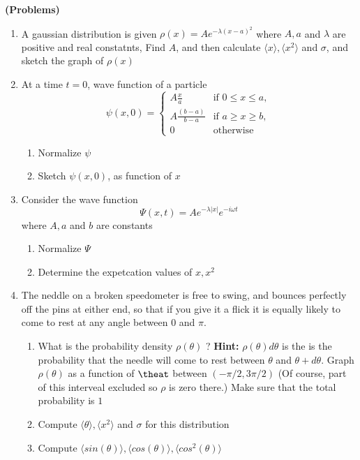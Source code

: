 \documentclass{article}[12pt, a4paper]
\begin{document}
\centering \textbf{(Problems)}
\begin{enumerate}
\item A gaussian distribution is given $\rho(x) = A e^{-\lambda (x - a)^2}$ where $A, a$ and $\lambda$ are positive and real constatnts, Find $A$, and then calculate $\langle x \rangle, \langle x^2 \rangle $ and $\sigma$, and sketch the graph of $\rho (x)$

\item At a time $t = 0$, wave function of a particle
$$
\psi (x, 0) =
\begin{cases}
	A \frac{x}{a} & \text{if } 0 \le x \le a, \\
	A \frac{(b - a)}{b - a} & \text{if } a \ge x \ge b, \\
	0 & \text{otherwise}

\end{cases}$$
\begin{enumerate}
	\item Normalize $\psi$
	\item Sketch $\psi(x, 0)$, as function of $x$
\end{enumerate}

\item Consider the wave function $$\Psi(x,t) = Ae^{-\lambda |x|}e^{-i\omega t}$$
where $A, a$ and $b$ are constants
\begin{enumerate}
	\item Normalize $\Psi$
	\item Determine the expetcation values of $x, x^2$
\end{enumerate}

\item The neddle on a broken speedometer is free to swing, and bounces perfectly off the pins at
either end, so that if you give it a flick it is equally likely to come to rest at any angle between $0$ and $\pi$.
\begin{enumerate}
	\item What is the probability density $\rho(\theta)$ ? \textbf{Hint:} $\rho(\theta)d\theta$ is the
	is the probability that the needle will come to rest between $\theta$ and $\theta+d\theta$.
	Graph $\rho(\theta)$ as a function of $\theat$ between $(-\pi/2, 3\pi/2)$ (Of course, part of this interveal excluded
	so $\rho$ is zero there.) Make sure that the total probability is $1$
	\item Compute $\langle \theta \rangle, \langle x^2 \rangle$ and $\sigma$ for this distribution
	\item Compute $\langle sin(\theta) \rangle, \langle cos(\theta) \rangle, \langle cos^2(\theta) \rangle$
\end{enumerate}
\end{enumerate}
\end{document}
